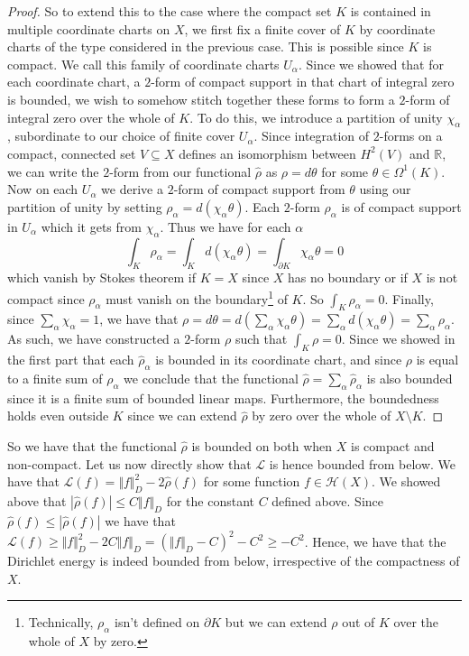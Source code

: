 \documentclass[11pt]{report}
\theoremstyle{definition}
\begin{document}
\begin{proof}
  So to extend this to the case where the compact set $K$ is contained in multiple coordinate charts on $X$, we first fix a finite cover of $K$ by coordinate charts of the type considered in the previous case. This is possible since $K$ is compact. We call this family of coordinate charts $U_{\alpha}$. Since we showed that for each coordinate chart, a $2$-form of compact support in that chart of integral zero is bounded, we wish to somehow stitch together these forms to form a $2$-form of integral zero over the whole of $K$. To do this, we introduce a partition of unity $\chi_{\alpha}$, subordinate to our choice of finite cover $U_{\alpha}$. Since integration of $2$-forms on a compact, connected set $V \subseteq X$ defines an isomorphism between $H^2(V)$ and $\mathbb{R}$, we can write the $2$-form from our functional $\hat{\rho}$ as $\rho = d\theta$ for some $\theta \in \Omega^1(K)$. Now on each $U_{\alpha}$ we derive a $2$-form of compact support from $\theta$ using our partition of unity by setting $\rho_{\alpha} = d(\chi_{\alpha}\theta)$. Each $2$-form $\rho_{\alpha}$ is of compact support in $U_{\alpha}$ which it gets from $\chi_{\alpha}$. Thus we have for each $\alpha$
  \[ \int_K\rho_{\alpha} = \int_K d(\chi_{\alpha}\theta) = \int_{\partial K} \chi_{\alpha}\theta = 0 \]
  which vanish by Stokes theorem if $K=X$ since $X$ has no boundary or if $X$ is not compact since $\rho_\alpha$ must vanish on the boundary\footnote{Technically, $\rho_{\alpha}$ isn't defined on $\partial K$ but we can extend $\rho$ out of $K$ over the whole of $X$ by zero.} of $K$. So $\int_K \rho_{\alpha} = 0$. Finally, since $\sum_{\alpha} \chi_{\alpha} = 1$, we have that 
  $ \rho = d\theta = d\left(\sum_{\alpha}\chi_{\alpha}\theta\right) = \sum_{\alpha}d(\chi_{\alpha}\theta) = \sum_{\alpha}\rho_{\alpha}$.
  As such, we have constructed a $2$-form $\rho$ such that $\int_K \rho = 0$. Since we showed in the first part that each $\hat{\rho}_{\alpha}$ is bounded in its coordinate chart, and since $\rho$ is equal to a finite sum of $\rho_{\alpha}$ we conclude that the functional $\hat{\rho} = \sum_{\alpha}\hat{\rho}_{\alpha}$ is also bounded since it is a finite sum of bounded linear maps. Furthermore, the boundedness holds even outside $K$ since we can extend $\hat{\rho}$ by zero over the whole of $X\setminus K$.
\end{proof}

So we have that the functional $\hat{\rho}$ is bounded on both when $X$ is compact and non-compact. Let us now directly show that $\mathcal{L}$ is hence bounded from below. We have that $\mathcal{L}(f) = \Vert f \Vert^2_D -2\hat{\rho}(f) $ for some function $f \in \mathcal{H}(X)$. We showed above that $|\hat{\rho}(f)| \leq C \Vert f \Vert_D$ for the constant $C$ defined above. Since $\hat{\rho}(f) \leq |\hat{\rho}(f)|$ we have that $ \mathcal{L}(f) \geq \Vert f \Vert^2_D -2C \Vert f \Vert_D = (\Vert f \Vert_D - C)^2 - C^2 \geq - C^2$. Hence, we have that the Dirichlet energy is indeed bounded from below, irrespective of the compactness of $X$.
\end{document}
